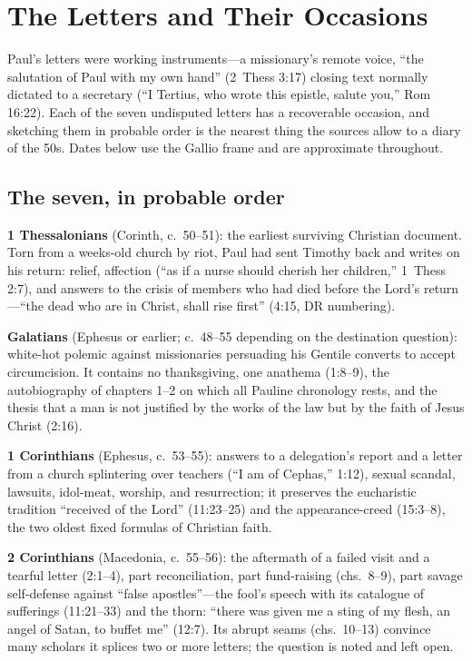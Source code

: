 \section{The Letters and Their Occasions}

Paul's letters were working instruments---a missionary's remote voice,
``the salutation of Paul with my own hand'' (2~Thess 3:17) closing text
normally dictated to a secretary (``I Tertius, who wrote this epistle,
salute you,'' Rom 16:22). Each of the seven undisputed letters has a
recoverable occasion, and sketching them in probable order is the nearest
thing the sources allow to a diary of the 50s. Dates below use the Gallio
frame and are approximate throughout.

\subsection{The seven, in probable order}

\textbf{1 Thessalonians} (Corinth, c.~50--51): the earliest surviving
Christian document. Torn from a weeks-old church by riot, Paul had sent
Timothy back and writes on his return: relief, affection (``as if a nurse
should cherish her children,'' 1~Thess 2:7), and answers to the crisis of
members who had died before the Lord's return---``the dead who are in
Christ, shall rise first'' (4:15, DR numbering).

\textbf{Galatians} (Ephesus or earlier; c.~48--55 depending on the
destination question): white-hot polemic against missionaries persuading
his Gentile converts to accept circumcision. It contains no thanksgiving,
one anathema (1:8--9), the autobiography of chapters 1--2 on which all
Pauline chronology rests, and the thesis that a man is not justified by
the works of the law but by the faith of Jesus Christ (2:16).

\textbf{1 Corinthians} (Ephesus, c.~53--55): answers to a delegation's
report and a letter from a church splintering over teachers (``I am of
Cephas,'' 1:12), sexual scandal, lawsuits, idol-meat, worship, and
resurrection; it preserves the eucharistic tradition ``received of the
Lord'' (11:23--25) and the appearance-creed (15:3--8), the two oldest
fixed formulas of Christian faith.

\textbf{2 Corinthians} (Macedonia, c.~55--56): the aftermath of a failed
visit and a tearful letter (2:1--4), part reconciliation, part
fund-raising (chs.~8--9), part savage self-defense against ``false
apostles''---the fool's speech with its catalogue of sufferings
(11:21--33) and the thorn: ``there was given me a sting of my flesh, an
angel of Satan, to buffet me'' (12:7). Its abrupt seams (chs.~10--13)
convince many scholars it splices two or more letters; the question is
noted and left open.

